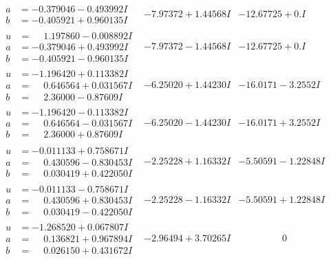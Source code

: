\documentclass[1p]{elsarticle_modified}
\theoremstyle{definition}
\begin{document}
$$\begin{array}{c|c|c}
\begin{aligned}
a &= -0.379046 - 0.493992 I \\
b &= -0.405921 + 0.960135 I\end{aligned}
 & -7.97372 + 1.44568 I & -12.67725 + 0. I\phantom{ +0.000000I} \\ \hline\begin{aligned}
u &= \phantom{-}1.197860 - 0.008892 I \\
a &= -0.379046 + 0.493992 I \\
b &= -0.405921 - 0.960135 I\end{aligned}
 & -7.97372 - 1.44568 I & -12.67725 + 0. I\phantom{ +0.000000I} \\ \hline\begin{aligned}
u &= -1.196420 + 0.113382 I \\
a &= \phantom{-}0.646564 + 0.031567 I \\
b &= \phantom{-}2.36000 - 0.87609 I\end{aligned}
 & -6.25020 + 1.44230 I & -16.0171 - 3.2552 I \\ \hline\begin{aligned}
u &= -1.196420 - 0.113382 I \\
a &= \phantom{-}0.646564 - 0.031567 I \\
b &= \phantom{-}2.36000 + 0.87609 I\end{aligned}
 & -6.25020 - 1.44230 I & -16.0171 + 3.2552 I \\ \hline\begin{aligned}
u &= -0.011133 + 0.758671 I \\
a &= \phantom{-}0.430596 - 0.830453 I \\
b &= \phantom{-}0.030419 + 0.422050 I\end{aligned}
 & -2.25228 + 1.16332 I & -5.50591 - 1.22848 I \\ \hline\begin{aligned}
u &= -0.011133 - 0.758671 I \\
a &= \phantom{-}0.430596 + 0.830453 I \\
b &= \phantom{-}0.030419 - 0.422050 I\end{aligned}
 & -2.25228 - 1.16332 I & -5.50591 + 1.22848 I \\ \hline\begin{aligned}
u &= -1.268520 + 0.067807 I \\
a &= \phantom{-}0.136821 + 0.967894 I \\
b &= \phantom{-}0.026150 + 0.431672 I\end{aligned}
 & -2.96494 + 3.70265 I & \phantom{-0.000000 } 0 \\ \hline\begin{aligned}

\end{aligned}
\end{array}$$
\end{document}

